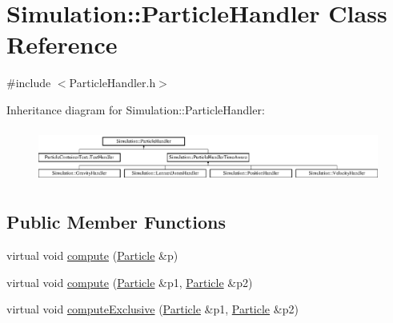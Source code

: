 \hypertarget{classSimulation_1_1ParticleHandler}{\section{Simulation\-:\-:Particle\-Handler Class Reference}
\label{classSimulation_1_1ParticleHandler}
}


{\ttfamily \#include $<$Particle\-Handler.\-h$>$}

Inheritance diagram for Simulation\-:\-:Particle\-Handler\-:\begin{figure}[H]
\begin{center}
\leavevmode
\includegraphics[height=1.794872cm]{classSimulation_1_1ParticleHandler}
\end{center}
\end{figure}
\subsection*{Public Member Functions}
\begin{DoxyCompactItemize}
\item 
virtual void \hyperlink{classSimulation_1_1ParticleHandler_a6b1fc310603bc10093d50c674097fd25}{compute} (\hyperlink{classSimulation_1_1Particle}{Particle} \&p)
\item 
virtual void \hyperlink{classSimulation_1_1ParticleHandler_a013ad557c6892ed2287db090192144ea}{compute} (\hyperlink{classSimulation_1_1Particle}{Particle} \&p1, \hyperlink{classSimulation_1_1Particle}{Particle} \&p2)
\item 
virtual void \hyperlink{classSimulation_1_1ParticleHandler_a4a1caeb40ada4f410fec9244bda4af69}{compute\-Exclusive} (\hyperlink{classSimulation_1_1Particle}{Particle} \&p1, \hyperlink{classSimulation_1_1Particle}{Particle} \&p2)
\end{DoxyCompactItemize}



